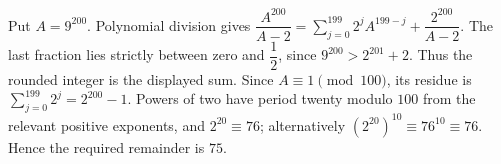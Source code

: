 Put $A=9^{200}$. Polynomial division gives $\dfrac{A^{200}}{A-2}=\sum_{j=0}^{199}2^jA^{199-j}+\dfrac{2^{200}}{A-2}$. The last fraction lies strictly between zero and $\dfrac{1}{2}$, since $9^{200}>2^{201}+2$. Thus the rounded integer is the displayed sum. Since $A\equiv1\pmod{100}$, its residue is $\sum_{j=0}^{199}2^j=2^{200}-1$. Powers of two have period twenty modulo $100$ from the relevant positive exponents, and $2^{20}\equiv76$; alternatively $(2^{20})^{10}\equiv76^{10}\equiv76$. Hence the required remainder is $\boxed{75}$.
